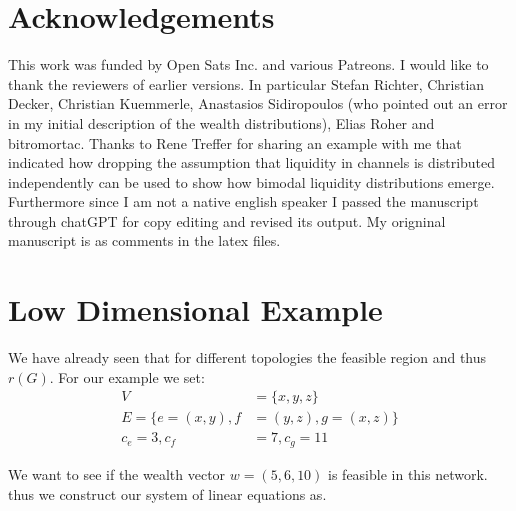 \documentclass[10pt,twocolumn]{article}
\begin{document}
\section{Acknowledgements}
This work was funded by Open Sats Inc. and various Patreons. I would like to thank the reviewers of earlier versions. In particular Stefan Richter, Christian Decker, Christian Kuemmerle, Anastasios Sidiropoulos (who pointed out an error in my initial description of the wealth distributions), Elias Roher and bitromortac. Thanks to Rene Treffer for sharing an example with me that indicated how dropping the assumption that liquidity in channels is distributed independently can be used to show how bimodal liquidity distributions emerge.
Furthermore since I am not a native english speaker I passed the manuscript through chatGPT for copy editing and revised its output. My origninal manuscript is as comments in the latex files.





\appendix

  \section{Low Dimensional Example}
\label{sec:paymentsExample}
We have already seen that for different topologies the feasible region and thus $r(G)$.
For our example we set:
\begin{equation*}
  \begin{split}
    V   & =\{x,y,z\} \\
    E=\{e=(x,y),f & =(y,z), g=(x,z)\}\\
    c_e=3, c_f & =7, c_g=11
  \end{split}
\end{equation*}

We want to see if the wealth vector $w=(5,6,10)$ is feasible in this network.
thus we construct our system of linear equations as.
\end{document}
